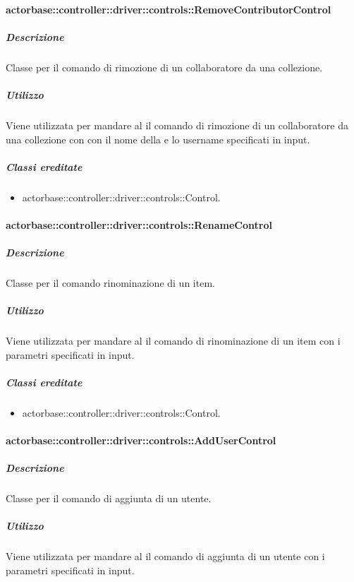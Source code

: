 \documentclass{scalatekids-article}
\begin{document}
\paragraph{actorbase::controller::driver::controls::RemoveContributorControl}

\subparagraph{Descrizione}

Classe per il comando di rimozione di un collaboratore da una collezione.

\subparagraph{Utilizzo}

Viene utilizzata per mandare al  il comando di rimozione di un collaboratore da una collezione con con il nome della  e lo username specificati in input.

\subparagraph{Classi ereditate}

\begin{itemize}
\item actorbase::controller::driver::controls::Control.
\end{itemize}

\paragraph{actorbase::controller::driver::controls::RenameControl}

\subparagraph{Descrizione}

Classe per il comando rinominazione di un item.

\subparagraph{Utilizzo}

Viene utilizzata per mandare al  il comando di rinominazione di un item con i parametri specificati in input.

\subparagraph{Classi ereditate}

\begin{itemize}
\item actorbase::controller::driver::controls::Control.
\end{itemize}

\paragraph{actorbase::controller::driver::controls::AddUserControl}

\subparagraph{Descrizione}

Classe per il comando di aggiunta di un utente.

\subparagraph{Utilizzo}

Viene utilizzata per mandare al  il comando di aggiunta di un utente con i parametri specificati in input.
\end{document}
